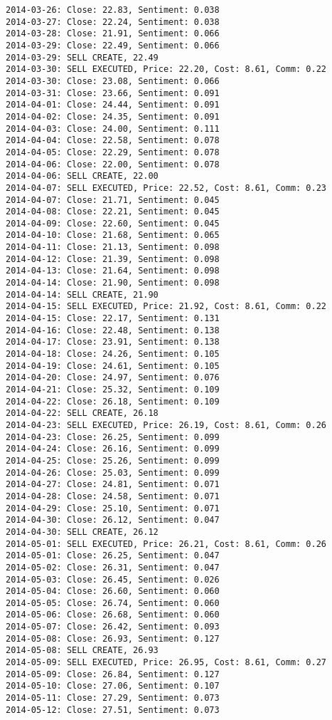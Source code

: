 \documentclass[11pt]{article}
\begin{document}
\begin{Verbatim}[commandchars=\\\{\}]
2014-03-26: Close: 22.83, Sentiment: 0.038
2014-03-27: Close: 22.24, Sentiment: 0.038
2014-03-28: Close: 21.91, Sentiment: 0.066
2014-03-29: Close: 22.49, Sentiment: 0.066
2014-03-29: SELL CREATE, 22.49
2014-03-30: SELL EXECUTED, Price: 22.20, Cost: 8.61, Comm: 0.22
2014-03-30: Close: 23.08, Sentiment: 0.066
2014-03-31: Close: 23.66, Sentiment: 0.091
2014-04-01: Close: 24.44, Sentiment: 0.091
2014-04-02: Close: 24.35, Sentiment: 0.091
2014-04-03: Close: 24.00, Sentiment: 0.111
2014-04-04: Close: 22.58, Sentiment: 0.078
2014-04-05: Close: 22.29, Sentiment: 0.078
2014-04-06: Close: 22.00, Sentiment: 0.078
2014-04-06: SELL CREATE, 22.00
2014-04-07: SELL EXECUTED, Price: 22.52, Cost: 8.61, Comm: 0.23
2014-04-07: Close: 21.71, Sentiment: 0.045
2014-04-08: Close: 22.21, Sentiment: 0.045
2014-04-09: Close: 22.60, Sentiment: 0.045
2014-04-10: Close: 21.68, Sentiment: 0.065
2014-04-11: Close: 21.13, Sentiment: 0.098
2014-04-12: Close: 21.39, Sentiment: 0.098
2014-04-13: Close: 21.64, Sentiment: 0.098
2014-04-14: Close: 21.90, Sentiment: 0.098
2014-04-14: SELL CREATE, 21.90
2014-04-15: SELL EXECUTED, Price: 21.92, Cost: 8.61, Comm: 0.22
2014-04-15: Close: 22.17, Sentiment: 0.131
2014-04-16: Close: 22.48, Sentiment: 0.138
2014-04-17: Close: 23.91, Sentiment: 0.138
2014-04-18: Close: 24.26, Sentiment: 0.105
2014-04-19: Close: 24.61, Sentiment: 0.105
2014-04-20: Close: 24.97, Sentiment: 0.076
2014-04-21: Close: 25.32, Sentiment: 0.109
2014-04-22: Close: 26.18, Sentiment: 0.109
2014-04-22: SELL CREATE, 26.18
2014-04-23: SELL EXECUTED, Price: 26.19, Cost: 8.61, Comm: 0.26
2014-04-23: Close: 26.25, Sentiment: 0.099
2014-04-24: Close: 26.16, Sentiment: 0.099
2014-04-25: Close: 25.26, Sentiment: 0.099
2014-04-26: Close: 25.03, Sentiment: 0.099
2014-04-27: Close: 24.81, Sentiment: 0.071
2014-04-28: Close: 24.58, Sentiment: 0.071
2014-04-29: Close: 25.10, Sentiment: 0.071
2014-04-30: Close: 26.12, Sentiment: 0.047
2014-04-30: SELL CREATE, 26.12
2014-05-01: SELL EXECUTED, Price: 26.21, Cost: 8.61, Comm: 0.26
2014-05-01: Close: 26.25, Sentiment: 0.047
2014-05-02: Close: 26.31, Sentiment: 0.047
2014-05-03: Close: 26.45, Sentiment: 0.026
2014-05-04: Close: 26.60, Sentiment: 0.060
2014-05-05: Close: 26.74, Sentiment: 0.060
2014-05-06: Close: 26.68, Sentiment: 0.060
2014-05-07: Close: 26.42, Sentiment: 0.093
2014-05-08: Close: 26.93, Sentiment: 0.127
2014-05-08: SELL CREATE, 26.93
2014-05-09: SELL EXECUTED, Price: 26.95, Cost: 8.61, Comm: 0.27
2014-05-09: Close: 26.84, Sentiment: 0.127
2014-05-10: Close: 27.06, Sentiment: 0.107
2014-05-11: Close: 27.29, Sentiment: 0.073
2014-05-12: Close: 27.51, Sentiment: 0.073

\end{Verbatim}
\end{document}
